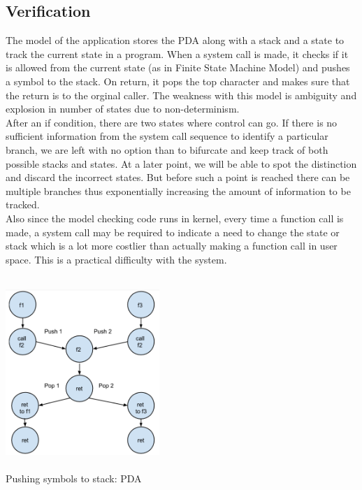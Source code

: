 \documentclass[11pt]{article} %
\begin{document}
\subsection {Verification}
The model of the application stores the PDA along with a stack and a state to
track the current state in a program. When a system call is made, it checks if
it is allowed from the current state (as in Finite State Machine Model) and
 pushes a symbol to the stack. On return, it pops the top character and makes
sure that the return is to the orginal caller. The weakness with this model is
ambiguity and explosion in number of states due to non-determinism.\\

After an if condition, there are two states where control can go. If there is
no sufficient information from the system call sequence to identify a particular
branch, we are left with no option than to bifurcate and keep track of both possible
stacks and states. At a later point, we will be able to spot the distinction
and discard the incorrect states. But before such a point is reached there can
be multiple branches thus exponentially increasing the amount of information to
be tracked.\\

Also since the model checking code runs in kernel, every time a function call is
made, a system call may be required to indicate a need to change the state or
stack which is a lot more costlier than actually making a function call in user 
space. This is a practical difficulty with the system.

\begin {center}
\includegraphics [width=220px,height=275px]{img/img1.png}\\
\caption {Pushing symbols to stack: PDA}
\end {center}
\end{document}
